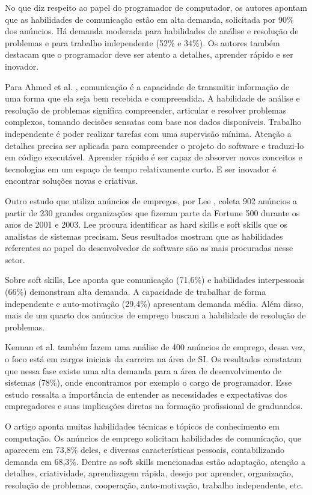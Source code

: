 No que diz respeito ao papel do programador de computador, os autores apontam que as habilidades de comunicação estão em alta demanda, solicitada por 90\% dos anúncios. Há demanda moderada para habilidades de análise e resolução de problemas e para trabalho independente (52\% e 34\%). Os autores também destacam que o programador deve ser atento a detalhes, aprender rápido e ser inovador.

Para Ahmed et al. \cite{ahmed:12}, comunicação é a capacidade de transmitir informação de uma forma que ela seja bem recebida e compreendida. A habilidade de análise e resolução de problemas significa compreender, articular e resolver problemas complexos, tomando decisões sensatas com base nos dados disponíveis. Trabalho independente é poder realizar tarefas com uma supervisão mínima. Atenção a detalhes precisa ser aplicada para compreender o projeto do software e traduzi-lo em código executável. Aprender rápido é ser capaz de absorver novos conceitos e tecnologias em um espaço de tempo relativamente curto. E ser inovador é encontrar soluções novas e criativas.

Outro estudo que utiliza anúncios de empregos, por Lee \cite{lee:05}, coleta 902 anúncios a partir de 230 grandes organizações que fizeram parte da Fortune 500 durante os anos de 2001 e 2003. Lee procura identificar as hard skills e soft skills que os analistas de sistemas precisam. Seus resultados mostram que as habilidades referentes ao papel do desenvolvedor de software são as mais procuradas nesse setor.

Sobre soft skills, Lee aponta que comunicação (71,6\%) e habilidades interpessoais (66\%) demonstram alta demanda.
A capacidade de trabalhar de forma independente e auto-motivação (29,4\%) apresentam demanda média.
Além disso, mais de um quarto dos anúncios de emprego buscam a habilidade de resolução de problemas.

Kennan et al. \cite{kennan:09} também fazem uma análise de 400 anúncios de emprego, dessa vez, o foco está em cargos iniciais da carreira na área de SI. Os resultados constatam que nessa fase existe uma alta demanda para a área de desenvolvimento de sistemas (78\%), onde encontramos por exemplo o cargo de programador. Esse estudo ressalta a importância de entender as necessidades e expectativas dos empregadores e suas implicações diretas na formação profissional de graduandos.

O artigo aponta muitas habilidades técnicas e tópicos de conhecimento em computação. Os anúncios de emprego solicitam habilidades de comunicação, que aparecem em 73,8\% deles, e diversas características pessoais, contabilizando demanda em 68,3\%. Dentre as soft skills mencionadas estão adaptação, atenção a detalhes, criatividade, aprendizagem rápida, desejo por aprender, organização, resolução de problemas, cooperação, auto-motivação, trabalho independente, etc. 


